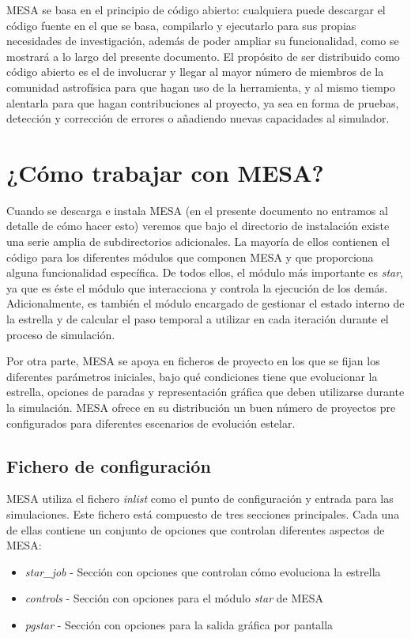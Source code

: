 MESA se basa en el principio de código abierto: cualquiera puede descargar el código fuente en el que se basa, compilarlo y ejecutarlo para sus propias necesidades de investigación, además de poder ampliar su funcionalidad, como se mostrará a lo largo del presente documento. El propósito de ser distribuido como código abierto es el de involucrar y llegar al mayor número de miembros de la comunidad astrofísica para que hagan uso de la herramienta, y al mismo tiempo alentarla para que hagan contribuciones al proyecto, ya sea en forma de pruebas, detección y corrección de errores o añadiendo nuevas capacidades al simulador.\par

\section{¿Cómo trabajar con MESA?}
Cuando se descarga e instala MESA (en el presente documento no entramos al detalle de cómo hacer esto) veremos que bajo el directorio de instalación existe una serie amplia de subdirectorios adicionales. La mayoría de ellos contienen el código para los diferentes módulos que componen MESA y que proporciona alguna funcionalidad específica. De todos ellos, el módulo más importante es \textit{star}, ya que es éste el módulo que interacciona y controla la ejecución de los demás. Adicionalmente, es también el módulo encargado de gestionar el estado interno de la estrella y de calcular el paso temporal a utilizar en cada iteración durante el proceso de simulación.\par

Por otra parte, MESA se apoya en ficheros de proyecto en los que se fijan los diferentes parámetros iniciales, bajo qué condiciones tiene que evolucionar la estrella, opciones de paradas y representación gráfica que deben utilizarse durante la simulación. MESA ofrece en su distribución un buen número de proyectos pre configurados para diferentes escenarios de evolución estelar.\par

\subsection{Fichero de configuración}
MESA utiliza el fichero \textit{inlist} como el punto de configuración y entrada para las simulaciones. Este fichero está compuesto de tres secciones principales. Cada una de ellas contiene un conjunto de opciones que controlan diferentes aspectos de MESA:
\begin{itemize}
    \item \textit{star\_job} - Sección con opciones que controlan cómo evoluciona la estrella
    \item \textit{controls} - Sección con opciones para el módulo \textit{star} de MESA
    \item \textit{pgstar} - Sección con opciones para la salida gráfica por pantalla
\end{itemize}

